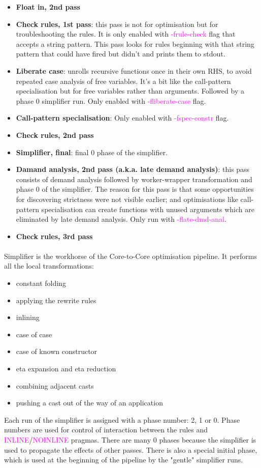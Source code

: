 \documentclass{article}
\begin{document}
\begin{itemize}
		\item \textbf{Float in, 2nd pass}
		\item \textbf{Check rules, 1st pass}: this pass is not for optimisation but for troubleshooting the rules. It is only enabled with \textcolor{magenta}{-frule-check} flag that accepts a string pattern. This pass looks for rules beginning with that string pattern that could have fired but didn't and prints them to stdout.
		\item \textbf{Liberate case}: unrolls recursive functions once in their own RHS, to avoid repeated case analysis of free variables. It's a bit like the call-pattern specialisation but for free variables rather than arguments. Followed by a phase 0 simplifier run. Only enabled with \textcolor{magenta}{-fliberate-case} flag.
		\item \textbf{Call-pattern specialisation}: Only enabled with \textcolor{magenta}{-fspec-constr} flag.
		\item \textbf{Check rules, 2nd pass}
		\item \textbf{Simplifier, final}: final 0 phase of the simplifier.
		\item \textbf{Damand analysis, 2nd pass (a.k.a. late demand analysis)}: this pass consists of demand analysis followed by worker-wrapper transformation and phase 0 of the simplifier. The reason for this pass is that some opportunities for discovering strictness were not visible earlier; and optimisations like call-pattern specialisation can create functions with unused arguments which are eliminated by late demand analysis. Only run with \textcolor{magenta}{-flate-dmd-anal}.
		\item \textbf{Check rules, 3rd pass}
	\end{itemize}
	\paragraph{}
	Simplifier is the workhorse of the Core-to-Core optimisation pipeline. It performs all the local transformations:
	\begin{itemize}
		\item constant folding
		\item applying the rewrite rules
		\item inlining
		\item case of case
		\item case of known constructor
		\item eta expansion and eta reduction
		\item combining adjacent casts
		\item pushing a cast out of the way of an application
	\end{itemize}
	Each run of the simplifier is assigned with a phase number: 2, 1 or 0. Phase numbers are used for control of interaction between the rules and \textcolor{magenta}{INLINE}/\textcolor{magenta}{NOINLINE} pragmas. There are many 0 phases because the simplifier is used to propagate the effects of other passes. There is also a special initial phase, which is used at the beginning of the pipeline by the "gentle" simplifier runs.
\end{document}
